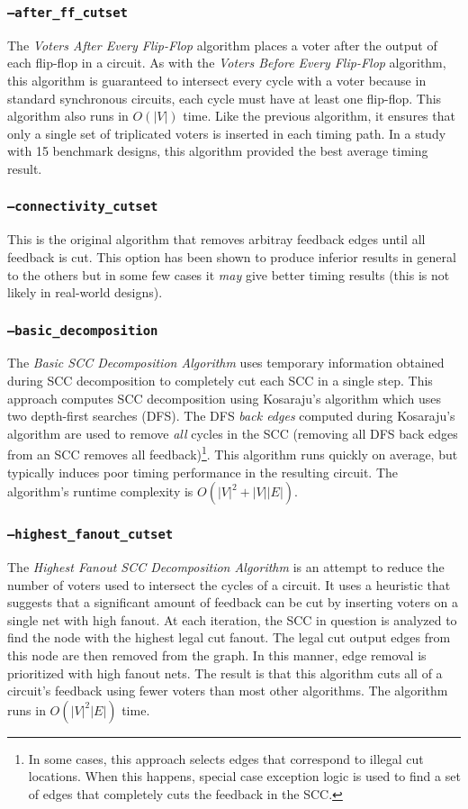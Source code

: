 \subsubsection{\texttt{--after\_ff\_cutset}}
The \emph{Voters After Every Flip-Flop} algorithm places a voter after
the output of each flip-flop in a circuit. As with the \emph{Voters
Before Every Flip-Flop} algorithm, this algorithm is guaranteed to
intersect every cycle with a voter because in standard synchronous
circuits, each cycle must have at least one flip-flop. This algorithm
also runs in $O(|V|)$ time. Like the previous algorithm, it ensures
that only a single set of triplicated voters is inserted in each
timing path. In a study with 15 benchmark designs, this algorithm
provided the best average timing result.

\subsubsection{\texttt{--connectivity\_cutset}}
This is the original algorithm that removes arbitray feedback edges
until all feedback is cut. This option has been shown to produce
inferior results in general to the others but in some few cases it
\emph{may} give better timing results (this is not likely in
real-world designs).

\subsubsection{\texttt{--basic\_decomposition}}
The \emph{Basic SCC Decomposition Algorithm} uses temporary
information obtained during SCC decomposition to completely cut each
SCC in a single step.  This approach computes SCC decomposition using
Kosaraju's algorithm which uses two depth-first searches (DFS). The
DFS {\em back edges} computed during Kosaraju's algorithm are used to
remove {\em all} cycles in the SCC (removing all DFS back edges from
an SCC removes all feedback)\footnote{In some cases, this approach
selects edges that correspond to illegal cut locations.  When this
happens, special case exception logic is used to find a set of edges
that completely cuts the feedback in the SCC.}. This algorithm runs
quickly on average, but typically induces poor timing performance in
the resulting circuit. The algorithm's runtime complexity is $O(|V|^2
+ |V||E|)$.

\subsubsection{\texttt{--highest\_fanout\_cutset}}
The \emph{Highest Fanout SCC Decomposition Algorithm} is an attempt to
reduce the number of voters used to intersect the cycles of a
circuit. It uses a heuristic that suggests that a significant amount
of feedback can be cut by inserting voters on a single net with high
fanout. At each iteration, the SCC in question is analyzed to find the
node with the highest legal cut fanout. The legal cut output edges
from this node are then removed from the graph. In this manner, edge
removal is prioritized with high fanout nets. The result is that this
algorithm cuts all of a circuit's feedback using fewer voters than
most other algorithms. The algorithm runs in $O(|V|^2|E|)$ time.

